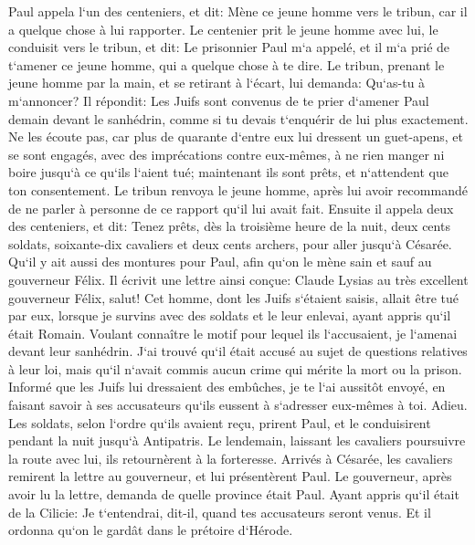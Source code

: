 \verse Paul appela l`un des centeniers, et dit: Mène ce jeune homme vers le tribun, car il a quelque chose à lui rapporter. 
\verse Le centenier prit le jeune homme avec lui, le conduisit vers le tribun, et dit: Le prisonnier Paul m`a appelé, et il m`a prié de t`amener ce jeune homme, qui a quelque chose à te dire. 
\verse Le tribun, prenant le jeune homme par la main, et se retirant à l`écart, lui demanda: Qu`as-tu à m`annoncer? 
\verse Il répondit: Les Juifs sont convenus de te prier d`amener Paul demain devant le sanhédrin, comme si tu devais t`enquérir de lui plus exactement. 
\verse Ne les écoute pas, car plus de quarante d`entre eux lui dressent un guet-apens, et se sont engagés, avec des imprécations contre eux-mêmes, à ne rien manger ni boire jusqu`à ce qu`ils l`aient tué; maintenant ils sont prêts, et n`attendent que ton consentement. 
\verse Le tribun renvoya le jeune homme, après lui avoir recommandé de ne parler à personne de ce rapport qu`il lui avait fait. 
\verse Ensuite il appela deux des centeniers, et dit: Tenez prêts, dès la troisième heure de la nuit, deux cents soldats, soixante-dix cavaliers et deux cents archers, pour aller jusqu`à Césarée. 
\verse Qu`il y ait aussi des montures pour Paul, afin qu`on le mène sain et sauf au gouverneur Félix. 
\verse Il écrivit une lettre ainsi conçue: 
\verse Claude Lysias au très excellent gouverneur Félix, salut! 
\verse Cet homme, dont les Juifs s`étaient saisis, allait être tué par eux, lorsque je survins avec des soldats et le leur enlevai, ayant appris qu`il était Romain. 
\verse Voulant connaître le motif pour lequel ils l`accusaient, je l`amenai devant leur sanhédrin. 
\verse J`ai trouvé qu`il était accusé au sujet de questions relatives à leur loi, mais qu`il n`avait commis aucun crime qui mérite la mort ou la prison. 
\verse Informé que les Juifs lui dressaient des embûches, je te l`ai aussitôt envoyé, en faisant savoir à ses accusateurs qu`ils eussent à s`adresser eux-mêmes à toi. Adieu. 
\verse Les soldats, selon l`ordre qu`ils avaient reçu, prirent Paul, et le conduisirent pendant la nuit jusqu`à Antipatris. 
\verse Le lendemain, laissant les cavaliers poursuivre la route avec lui, ils retournèrent à la forteresse. 
\verse Arrivés à Césarée, les cavaliers remirent la lettre au gouverneur, et lui présentèrent Paul. 
\verse Le gouverneur, après avoir lu la lettre, demanda de quelle province était Paul. Ayant appris qu`il était de la Cilicie: 
\verse Je t`entendrai, dit-il, quand tes accusateurs seront venus. Et il ordonna qu`on le gardât dans le prétoire d`Hérode. 

